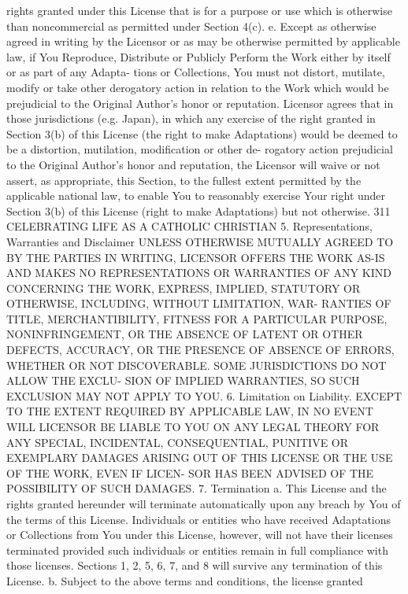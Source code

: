 \documentclass[oneside]{book}
\begin{document}
rights granted under this License that is for a purpose or use which is
otherwise than noncommercial as permitted under Section 4(c).  e. Except as
otherwise agreed in writing by the Licensor or as may be otherwise permitted by
applicable law, if You Reproduce, Distribute or Publicly Perform the Work either
by itself or as part of any Adapta- tions or Collections, You must not distort,
mutilate, modify or take other derogatory action in relation to the Work which
would be prejudicial to the Original Author's honor or reputation. Licensor
agrees that in those jurisdictions (e.g. Japan), in which any exercise of the
right granted in Section 3(b) of this License (the right to make Adaptations)
would be deemed to be a distortion, mutilation, modification or other de-
rogatory action prejudicial to the Original Author's honor and reputation, the
Licensor will waive or not assert, as appropriate, this Section, to the fullest
extent permitted by the applicable national law, to enable You to reasonably
exercise Your right under Section 3(b) of this License (right to make
Adaptations) but not otherwise.  311 CELEBRATING LIFE AS A CATHOLIC CHRISTIAN
5. Representations, Warranties and Disclaimer UNLESS OTHERWISE MUTUALLY AGREED
TO BY THE PARTIES IN WRITING, LICENSOR OFFERS THE WORK AS-IS AND MAKES NO
REPRESENTATIONS OR WARRANTIES OF ANY KIND CONCERNING THE WORK, EXPRESS, IMPLIED,
STATUTORY OR OTHERWISE, INCLUDING, WITHOUT LIMITATION, WAR- RANTIES OF TITLE,
MERCHANTIBILITY, FITNESS FOR A PARTICULAR PURPOSE, NONINFRINGEMENT, OR THE
ABSENCE OF LATENT OR OTHER DEFECTS, ACCURACY, OR THE PRESENCE OF ABSENCE OF
ERRORS, WHETHER OR NOT DISCOVERABLE. SOME JURISDICTIONS DO NOT ALLOW THE EXCLU-
SION OF IMPLIED WARRANTIES, SO SUCH EXCLUSION MAY NOT APPLY TO YOU.
6. Limitation on Liability.  EXCEPT TO THE EXTENT REQUIRED BY APPLICABLE LAW, IN
NO EVENT WILL LICENSOR BE LIABLE TO YOU ON ANY LEGAL THEORY FOR ANY SPECIAL,
INCIDENTAL, CONSEQUENTIAL, PUNITIVE OR EXEMPLARY DAMAGES ARISING OUT OF THIS
LICENSE OR THE USE OF THE WORK, EVEN IF LICEN- SOR HAS BEEN ADVISED OF THE
POSSIBILITY OF SUCH DAMAGES.  7. Termination a. This License and the rights
granted hereunder will terminate automatically upon any breach by You of the
terms of this License. Individuals or entities who have received Adaptations or
Collections from You under this License, however, will not have their licenses
terminated provided such individuals or entities remain in full compliance with
those licenses. Sections 1, 2, 5, 6, 7, and 8 will survive any termination of
this License.  b. Subject to the above terms and conditions, the license granted
\end{document}
